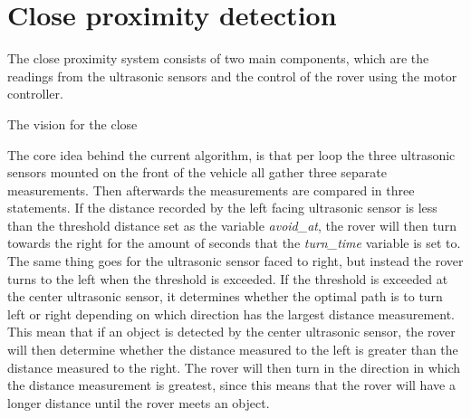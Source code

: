 \clearpage
\section{Close proximity detection}

The close proximity system consists of two main components, which are the readings from the ultrasonic sensors and the control of the rover using the motor controller.


The vision for the close

%



The core idea behind the current algorithm, is that per loop the three ultrasonic sensors mounted on the front of the vehicle all gather three separate measurements. Then afterwards the measurements are compared in three statements. If the distance recorded by the left facing ultrasonic sensor is less than the threshold distance set as the variable \textit{avoid\_at}, the rover will then turn towards the right for the amount of seconds that the \textit{turn\_time} variable is set to. The same thing goes for the ultrasonic sensor faced to right, but instead the rover turns to the left when the threshold is exceeded.
If the threshold is exceeded at the center ultrasonic sensor, it determines whether the optimal path is to turn left or right depending on which direction has the largest distance measurement. This mean that if an object is detected by the center ultrasonic sensor, the rover will then determine whether the distance measured to the left is greater than the distance measured to the right. The rover will then turn in the direction in which the distance measurement is greatest, since this means that the rover will have a longer distance until the rover meets an object.